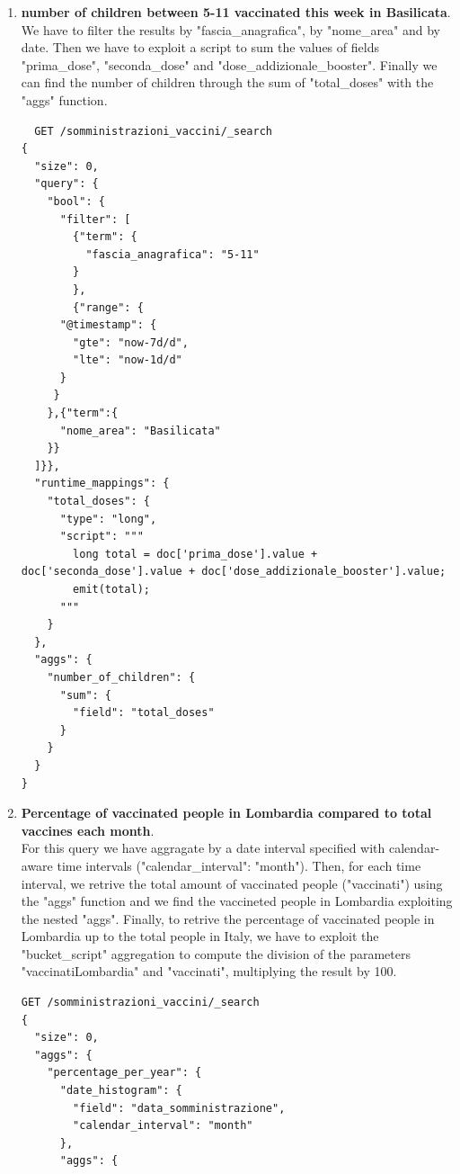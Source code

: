 \documentclass{article}
\begin{document}
\begin{enumerate}
\begin{lstlisting}
        }},
      "highest_disparity_of_vaccinations": {
        "max_bucket": {
          "buckets_path": "vaccinations_per_region > max_dif_of_vaccinations_between_male_female" 
     }
    }
  }
}
\end{lstlisting}
\item \textbf{number of children between 5-11 vaccinated this week in Basilicata}.\\We have to filter the results by "fascia\_anagrafica", by "nome\_area" and by date. Then we have to exploit a script to sum the values of fields "prima\_dose", "seconda\_dose" and "dose\_addizionale\_booster". Finally we can find the number of children through the sum of "total\_doses" with the "aggs" function.
\begin{lstlisting}
  GET /somministrazioni_vaccini/_search
{
  "size": 0,
  "query": {
    "bool": {
      "filter": [
        {"term": {
          "fascia_anagrafica": "5-11"
        }
        },
        {"range": {
      "@timestamp": {
        "gte": "now-7d/d",
        "lte": "now-1d/d"
      }
     }
    },{"term":{
      "nome_area": "Basilicata"
    }}
  ]}},
  "runtime_mappings": {
    "total_doses": {
      "type": "long",
      "script": """
        long total = doc['prima_dose'].value + doc['seconda_dose'].value + doc['dose_addizionale_booster'].value;
        emit(total);
      """
    }
  },
  "aggs": {
    "number_of_children": {
      "sum": {
        "field": "total_doses"
      }
    }
  }
}
\end{lstlisting}
\item \textbf{Percentage of vaccinated people in Lombardia compared to total vaccines each month}.\\
For this query we have aggragate by a date interval specified with calendar-aware time intervals ("calendar\_interval": "month"). Then, for each time interval, we retrive the total amount of vaccinated people ("vaccinati") using the "aggs" function and we find the vaccineted people in Lombardia exploiting the nested "aggs". Finally, to retrive the percentage of vaccinated people in Lombardia up to the total people in Italy, we have to exploit the "bucket\_script" aggregation to compute the division of the parameters "vaccinatiLombardia" and "vaccinati", multiplying the result by 100.
\begin{lstlisting}
GET /somministrazioni_vaccini/_search
{ 
  "size": 0,
  "aggs": {
    "percentage_per_year": {
      "date_histogram": {
        "field": "data_somministrazione",
        "calendar_interval": "month"
      },
      "aggs": {

\end{lstlisting}
\end{enumerate}
\end{document}
